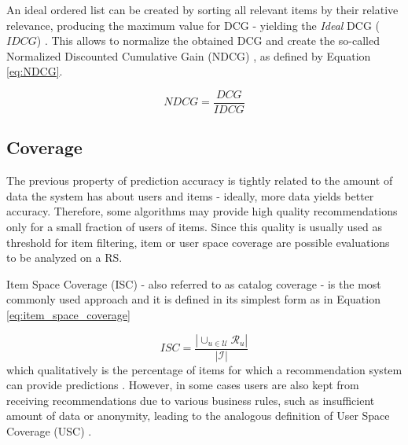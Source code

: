 An ideal ordered list can be created by sorting all relevant items by their relative relevance, producing the maximum value for DCG - yielding the \textit{Ideal} DCG ($IDCG$) . This allows to normalize the obtained DCG and create the so-called Normalized Discounted Cumulative Gain (NDCG) , as defined by Equation \ref{eq:NDCG}.

\begin{equation}
	\label{eq:NDCG}
	NDCG = \frac{DCG}{IDCG}
\end{equation}

\subsection{Coverage}

The previous property of prediction accuracy is tightly related to the amount of data the system has about users and items - ideally, more data yields better accuracy. Therefore, some algorithms may provide high quality recommendations only for a small fraction of users of items. Since this quality is usually used as threshold for item filtering, item or user space coverage are possible evaluations to be analyzed on a RS. 

Item Space Coverage (ISC)  - also referred to as catalog coverage - is the most commonly used approach and it is defined in its simplest form as in Equation \ref{eq:item_space_coverage}

\begin{equation}
    \label{eq:item_space_coverage}
    ISC = \frac{|\cup_{u \in \mathcal{U}} \mathcal{R}_u|}{|\mathcal{I}|}
\end{equation} which qualitatively is the percentage of items for which a recommendation system can provide predictions \cite{1999AlgorithmicFramework}. However, in some cases users are also kept from receiving recommendations due to various business rules, such as insufficient amount of data or anonymity, leading to the analogous definition of User Space Coverage (USC)  \cite{2011EvaluatingRS}.





